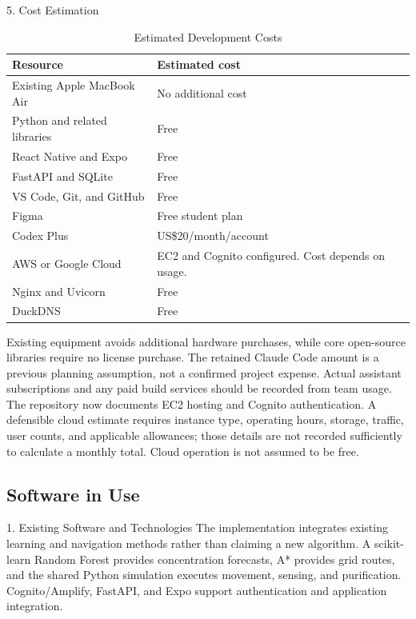 \documentclass[conference]{IEEEtran}
\newlength{\tablebodywidth}
\begin{document}
5. Cost Estimation

\begin{table}[!t]
\caption{Estimated Development Costs}
\label{tab:t2}
\centering\footnotesize
\setlength{\tabcolsep}{3pt}
\setlength{\tablebodywidth}{\dimexpr\columnwidth-12pt\relax}
\begin{tabular}{>{\raggedright\arraybackslash}p{0.500\tablebodywidth}>{\raggedright\arraybackslash}p{0.500\tablebodywidth}}
\toprule
\textbf{Resource} & \textbf{Estimated cost} \\
\midrule
Existing Apple MacBook Air & No additional cost \\
Python and related libraries & Free \\
React Native and Expo & Free \\
FastAPI and SQLite & Free \\
VS Code, Git, and GitHub & Free \\
Figma & Free student plan \\
Codex Plus & US\$20/month/account \\
AWS or Google Cloud & EC2 and Cognito configured. Cost depends on usage. \\
Nginx and Uvicorn & Free \\
DuckDNS & Free \\
\bottomrule
\end{tabular}
\end{table}

Existing equipment avoids additional hardware purchases, while core open-source libraries require no license purchase. The retained Claude Code amount is a previous planning assumption, not a confirmed project expense. Actual assistant subscriptions and any paid build services should be recorded from team usage. The repository now documents EC2 hosting and Cognito authentication. A defensible cloud estimate requires instance type, operating hours, storage, traffic, user counts, and applicable allowances; those details are not recorded sufficiently to calculate a monthly total. Cloud operation is not assumed to be free.

\subsection{Software in Use}

1. Existing Software and Technologies The implementation integrates existing learning and navigation methods rather than claiming a new algorithm. A scikit-learn Random Forest provides concentration forecasts, A* provides grid routes, and the shared Python simulation executes movement, sensing, and purification. Cognito/Amplify, FastAPI, and Expo support authentication and application integration.
\end{document}
